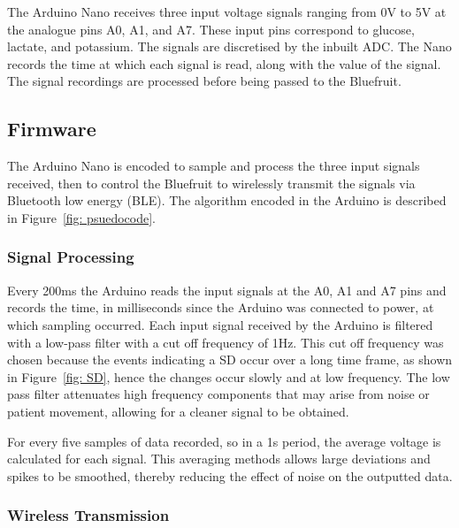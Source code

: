 The Arduino Nano receives three input voltage signals ranging from 0V to 5V at the analogue pins A0, A1, and A7. These input pins correspond to glucose, lactate, and potassium. The signals are discretised by the inbuilt ADC. The Nano records the time at which each signal is read, along with the value of the signal. The signal recordings are processed before being passed to the Bluefruit.



\subsection{Firmware}
The Arduino Nano is encoded to sample and process the three input signals received, then to control the Bluefruit to wirelessly transmit the signals via Bluetooth low energy (BLE). The algorithm encoded in the Arduino is described in Figure~\ref{fig: psuedocode}.


\subsubsection{Signal Processing}
Every 200ms the Arduino reads the input signals at the A0, A1 and A7 pins and records the time, in milliseconds since the Arduino was connected to power, at which sampling occurred. Each input signal received by the Arduino is filtered with a low-pass filter with a cut off frequency of 1Hz. This cut off frequency was chosen because the events indicating a SD occur over a long time frame, as shown in Figure~\ref{fig: SD}, hence the changes occur slowly and at low frequency. The low pass filter attenuates high frequency components that may arise from noise or patient movement, allowing for a cleaner signal to be obtained.

For every five samples of data recorded, so in a 1s period, the average voltage is calculated for each signal. This averaging methods allows large deviations and spikes to be smoothed, thereby reducing the effect of noise on the outputted data.


\subsubsection{Wireless Transmission}

